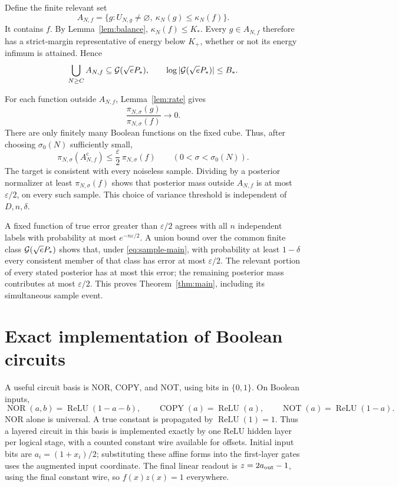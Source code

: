 \documentclass[11pt]{article}
\theoremstyle{remark}\newtheorem{remark}[theorem]{Remark}
\newcommand{\relu}{\operatorname{ReLU}}
\begin{document}
Define the finite relevant set
\[
 A_{N,f}=\{g:U_{N,g}\ne\varnothing,\ \kappa_N(g)\le\kappa_N(f)\}.
\]
It contains $f$. By Lemma~\ref{lem:balance}, $\kappa_N(f)\le K_*$. Every $g\in A_{N,f}$ therefore has a strict-margin representative of energy below $K_+$, whether or not its energy infimum is attained. Hence
\[
 \bigcup_{N\ge C} A_{N,f}\subseteq\mathcal G(\sqrt e P_*),
 \qquad \log|\mathcal G(\sqrt e P_*)|\le B_*.
\]

For each function outside $A_{N,f}$, Lemma~\ref{lem:rate} gives
\[
 \frac{\pi_{N,\sigma}(g)}{\pi_{N,\sigma}(f)}\longrightarrow0.
\]
There are only finitely many Boolean functions on the fixed cube. Thus, after choosing $\sigma_0(N)$ sufficiently small,
\[
 \pi_{N,\sigma}(A_{N,f}^{\mathrm c})\le\frac\varepsilon2\,\pi_{N,\sigma}(f)
 \qquad(0<\sigma<\sigma_0(N)).
\]
The target is consistent with every noiseless sample. Dividing by a posterior normalizer at least $\pi_{N,\sigma}(f)$ shows that posterior mass outside $A_{N,f}$ is at most $\varepsilon/2$, on every such sample. This choice of variance threshold is independent of $D,n,\delta$.

A fixed function of true error greater than $\varepsilon/2$ agrees with all $n$ independent labels with probability at most $e^{-n\varepsilon/2}$. A union bound over the common finite class $\mathcal G(\sqrt e P_*)$ shows that, under \eqref{eq:sample-main}, with probability at least $1-\delta$ every consistent member of that class has error at most $\varepsilon/2$. The relevant portion of every stated posterior has at most this error; the remaining posterior mass contributes at most $\varepsilon/2$. This proves Theorem~\ref{thm:main}, including its simultaneous sample event.

\section{Exact implementation of Boolean circuits}
A useful circuit basis is NOR, COPY, and NOT, using bits in $\{0,1\}$. On Boolean inputs,
\[
 \operatorname{NOR}(a,b)=\relu(1-a-b),\qquad
 \operatorname{COPY}(a)=\relu(a),\qquad
 \operatorname{NOT}(a)=\relu(1-a).
\]
NOR alone is universal. A true constant is propagated by $\relu(1)=1$. Thus a layered circuit in this basis is implemented exactly by one ReLU hidden layer per logical stage, with a counted constant wire available for offsets. Initial input bits are $a_i=(1+x_i)/2$; substituting these affine forms into the first-layer gates uses the augmented input coordinate. The final linear readout is $z=2a_{\rm out}-1$, using the final constant wire, so $f(x)z(x)=1$ everywhere.
\end{document}
